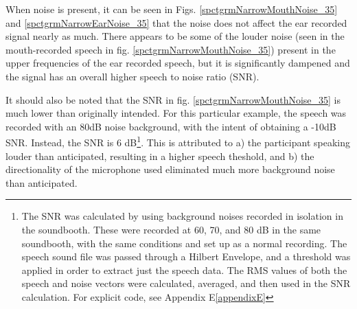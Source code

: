 \documentclass[dissertation,copyright]{uathesis}
\begin{document}
When noise is present, it can be seen in Figs. \ref{spctgrmNarrowMouthNoise_35} and \ref{spctgrmNarrowEarNoise_35} that the noise does not affect the ear recorded signal nearly as much.  There appears to be some of the louder noise (seen in the mouth-recorded speech in fig. \ref{spctgrmNarrowMouthNoise_35}) present in the upper frequencies of the ear recorded speech, but it is significantly dampened and the signal has an overall higher speech to noise ratio (SNR).

It should also be noted that the SNR in fig. \ref{spctgrmNarrowMouthNoise_35} is much lower than originally intended.  For this particular example, the speech was recorded with an 80dB noise background, with the intent of obtaining a -10dB SNR.  Instead, the SNR is 6 dB\footnote{The SNR was calculated by using background noises recorded in isolation in the soundbooth.  These were recorded at 60, 70, and 80 dB in the same soundbooth, with the same conditions and set up as a normal recording.  The speech sound file was passed through a Hilbert Envelope, and a threshold was applied in order to extract just the speech data.  The RMS values of both the speech and noise vectors were calculated, averaged, and then used in the SNR calculation.  For explicit code, see Appendix E\ref{appendixE}}.  This is attributed to a) the participant speaking louder than anticipated, resulting in a higher speech theshold, and b) the directionality of the microphone used eliminated much more background noise than anticipated.
\end{document}
